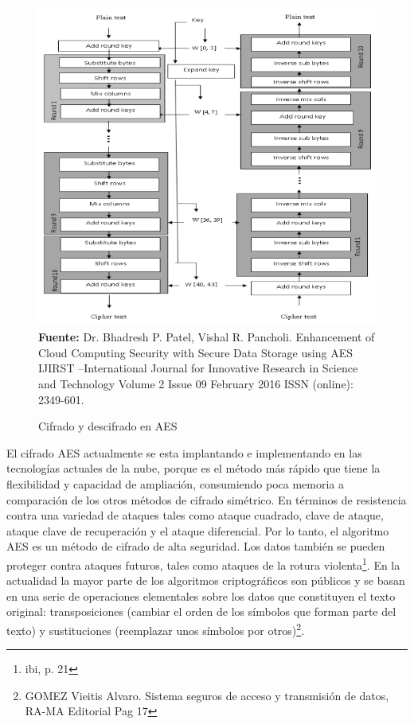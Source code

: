 \documentclass[a4paper,openright,12pt]{book}
\theoremstyle{definition}
\theoremstyle{remark}
\begin{document}
\begin{figure}[htb]
\centering
\caption{Cifrado y descifrado en AES} 
\includegraphics[scale=0.44]{AES}
\label{fig:CifradoAES}
\\ \textbf{Fuente:} Dr. Bhadresh P. Patel, Vishal R. Pancholi. Enhancement of Cloud Computing Security with Secure Data Storage using AES IJIRST –International Journal for Innovative Research in Science and Technology Volume 2 Issue 09 February 2016 ISSN (online): 2349-601.
\end{figure}

El cifrado AES actualmente se esta implantando e implementando en las tecnologías actuales de la nube, porque es el método más rápido que tiene la flexibilidad y capacidad de ampliación, consumiendo poca memoria a comparación de los otros métodos de cifrado simétrico. En términos de resistencia contra una variedad de ataques tales como ataque cuadrado, clave de ataque, ataque clave de recuperación y el ataque diferencial. Por lo tanto, el algoritmo AES es un método de cifrado de alta seguridad. Los datos también se pueden proteger contra ataques futuros, tales como ataques de la rotura violenta\footnote{ibi, p. 21}. En la actualidad la mayor parte de los algoritmos criptográficos son públicos y se basan en una serie de operaciones elementales sobre los datos que constituyen el texto original: transposiciones (cambiar el orden de los símbolos que forman parte del texto) y sustituciones  (reemplazar unos símbolos por otros)\footnote{GOMEZ Vieitis Alvaro. Sistema seguros de acceso y transmisión de datos, RA-MA Editorial Pag 17}.
\end{document}
